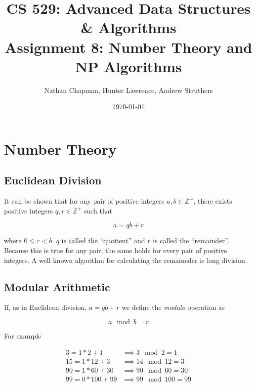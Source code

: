 \documentclass{article}
\title{\vspace*{-0.625in}CS 529: Advanced Data Structures \& Algorithms \\ Assignment 8: Number Theory and NP Algorithms}
\author{Nathan Chapman, Hunter Lawrence, Andrew Struthers}
\date{\today}
\renewcommand{\_}{\ifincsname_\else\legacyunderscore\fi}
\begin{document}
\maketitle

\section*{Number Theory}


    \subsection*{Euclidean Division}

        It can be shown that for any pair of positive integers $a, b \in \mathbb{Z}^+$, there exists positive integers $q, r \in \mathbb{Z}^+$ such that 

        \begin{equation}
            a = q b + r
        \end{equation}

        where $0 \leq r < b$.  $q$ is called the ``quotient'' and $r$ is called the ``remainder''.  Because this is true for any pair, the same holds for every pair of positive integers.  A well known algorithm for calculating the remaineder is long division.

    \subsection*{Modular Arithmetic}

        If, as in Euclidean division, $a = q b + r$ we define the \emph{modulo} operation as

        \begin{equation}
            a \mod b = r
        \end{equation}

        For example

        \begin{align}
            \label{eq:isEven}      3  = 1 * 2   + 1  &\implies 3  \mod 2   = 1 \\
            \label{eq:clock}       15 = 1 * 12  + 3  &\implies 14 \mod 12  = 3 \\
            \label{eq:minutes}     90 = 1 * 60  + 30 &\implies 90 \mod 60  = 30 \\
            \label{eq:zeroQutient} 99 = 0 * 100 + 99 &\implies 99 \mod 100 = 99
        \end{align}
\end{document}
